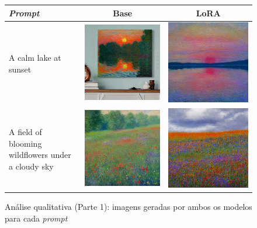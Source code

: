 \begin{figure}[htb]
\centering
\caption{Análise qualitativa (Parte 1): imagens geradas por ambos os modelos para cada \textit{prompt}}
\label{fig:analise_qualitativa_part1}

\begin{tabular}{p{4.5cm}c@{\hskip 0.5cm}c}
\toprule
\textbf{\textit{Prompt}} & \textbf{Base} & \textbf{LoRA} \\
\midrule

A calm lake at sunset &
\includegraphics[width=0.25\linewidth]{modelo_base/01_a_calm_lake_at_sunset.png} &
\includegraphics[width=0.25\linewidth]{modelo_lora/01_a_calm_lake_at_sunset.png} \\

A field of blooming wildflowers under a cloudy sky &
\includegraphics[width=0.25\linewidth]{modelo_base/02_a_field_of_blooming_wildflower.png} &
\includegraphics[width=0.25\linewidth]{modelo_lora/02_a_field_of_blooming_wildflower.png} \\


\end{tabular}
\end{figure}
